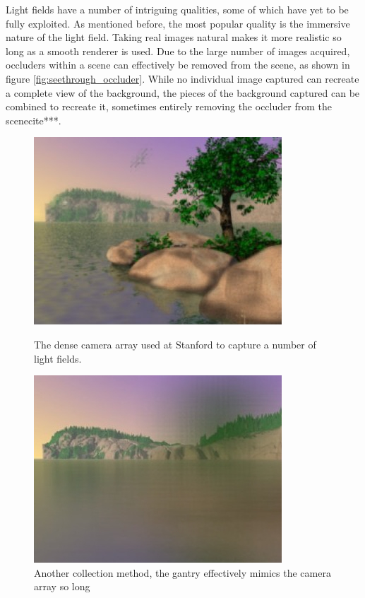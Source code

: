 \documentclass[12pt]{report}
\begin{document}
Light fields have a number of intriguing qualities, some of which have yet to be fully exploited. As mentioned before, the most popular quality is the immersive nature of the light field. Taking real images natural makes it more realistic so long as a smooth renderer is used. Due to the large number of images acquired, occluders within a scene can effectively be removed from the scene, as shown in figure \ref{fig:seethrough_occluder}. While no individual image captured can recreate a complete view of the background, the pieces of the background captured can be combined to recreate it, sometimes entirely removing the occluder from the scenecite***.
\begin{figure}[!ht]
	\centering
	\begin{minipage}{0.45\textwidth}
		\centering
		\includegraphics[scale=0.55]{seethrough_occluder.png}
		\caption{The dense camera array used at Stanford to capture a number of light fields.}
		\label{fig:seethrough_occluder}
	\end{minipage}\hfill
	\begin{minipage}{0.45\textwidth}
		\centering
		\includegraphics[scale=0.55]{seethrough_occluder2.png}
		\caption{Another collection method, the gantry effectively mimics the camera array so long}
		\label{fig:seethrough_occluder2}
	\end{minipage}
\end{figure}
\end{document}

